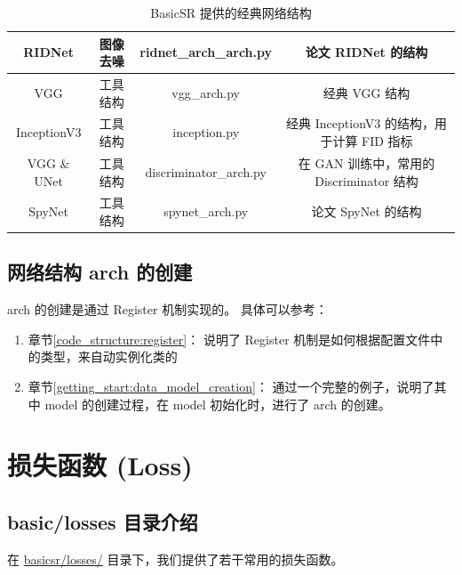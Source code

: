 \documentclass[../main.tex]{subfiles}
\begin{document}
\begin{table}[h]
{\begin{tabular}{|c|c|c|c|}
            RIDNet            & 图像去噪      & ridnet\_arch\_arch.py  & 论文 RIDNet 的结构                         \\ \hline
            VGG               & 工具结构      & vgg\_arch.py           & 经典 VGG 结构                              \\ \hline
            InceptionV3       & 工具结构      & inception.py           & 经典 InceptionV3 的结构，用于计算 FID 指标 \\ \hline
            VGG \& UNet       & 工具结构      & discriminator\_arch.py & 在 GAN 训练中，常用的 Discriminator 结构   \\ \hline
            SpyNet            & 工具结构      & spynet\_arch.py        & 论文 SpyNet 的结构                         \\ \hline
        \end{tabular}
    }
    \caption{BasicSR 提供的经典网络结构}
\end{table}

\subsection{网络结构 arch 的创建}\label{code_structure:arch_creation}

arch 的创建是通过 Register 机制实现的。
具体可以参考：
\begin{enumerate}
    \item 章节\ref{code_structure:register}： 说明了 Register 机制是如何根据配置文件中的类型，来自动实例化类的
    \item 章节\ref{getting_start:data_model_creation}： 通过一个完整的例子，说明了其中 model 的创建过程，在 model 初始化时，进行了 arch 的创建。
\end{enumerate}

\section{损失函数 (Loss)}\label{code_structure:loss}

\subsection{basic/losses 目录介绍}\label{code_structure:loss_contents}
在 \href{https://github.com/XPixelGroup/BasicSR/tree/master/basicsr/losses}{basicsr/losses/} 目录下，我们提供了若干常用的损失函数。
\end{document}
